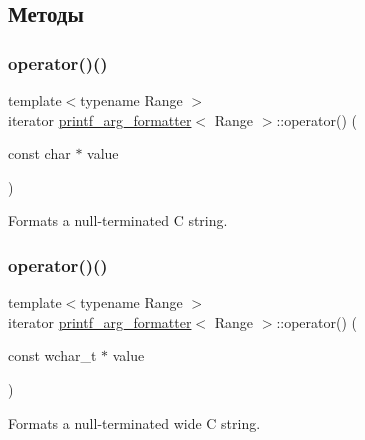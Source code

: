\subsection{Методы}
\mbox{\label{classprintf__arg__formatter_a4e462c5b70ceef75a41261472aa56313}} 
\subsubsection{\texorpdfstring{operator()()}{operator()()}\hspace{0.1cm}{\footnotesize\ttfamily [1/4]}}
{\footnotesize\ttfamily template$<$typename Range $>$ \\
iterator \hyperlink{classprintf__arg__formatter}{printf\+\_\+arg\+\_\+formatter}$<$ Range $>$\+::operator() (\begin{DoxyParamCaption}\item[{const char $\ast$}]{value }\end{DoxyParamCaption})\hspace{0.3cm}{\ttfamily [inline]}}

Formats a null-\/terminated C string. \mbox{\label{classprintf__arg__formatter_a880170cd3e3ace7546cb01268586ac77}} 
\subsubsection{\texorpdfstring{operator()()}{operator()()}\hspace{0.1cm}{\footnotesize\ttfamily [2/4]}}
{\footnotesize\ttfamily template$<$typename Range $>$ \\
iterator \hyperlink{classprintf__arg__formatter}{printf\+\_\+arg\+\_\+formatter}$<$ Range $>$\+::operator() (\begin{DoxyParamCaption}\item[{const wchar\+\_\+t $\ast$}]{value }\end{DoxyParamCaption})\hspace{0.3cm}{\ttfamily [inline]}}

Formats a null-\/terminated wide C string. \mbox{\label{classprintf__arg__formatter_a22c7d349112400ecf9a66005b1a0229e}} 
